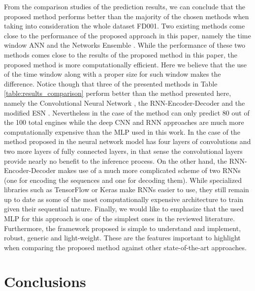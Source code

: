 \documentclass[preprint,12pt]{elsarticle}%
\begin{document}
From the comparison studies of the prediction results, we can conclude that
the proposed method performs better than the majority of the chosen methods
when taking into consideration the whole dataset FD001. Two existing methods
come close to the performance of the proposed approach in this paper, namely
the time window ANN \cite{Lim2016} and the Networks Ensemble \cite{Zhang2016}.
While the performance of these two methods comes close to the results of the
proposed method in this paper, the proposed method is more computationally
efficient. Here we believe that the use of the time window along with a proper size for such window makes the difference. Notice though that three of the presented methods in Table \ref{table:results_comparison} perform better than the method presented here, namely the Convolutional Neural Network \cite{Li2018}, the RNN-Encoder-Decoder \cite{Malhorta2016} and the modified ESN \cite{Peng2012}. Nevertheless in the case of \cite{Peng2012} the method can only predict 80 out of the 100 total engines while the deep CNN \cite{Li2018} and RNN \cite{Malhorta2016} approaches are much more computationally expensive than the MLP used in this work. In the case of the method proposed in \cite{Li2018} the neural network model has four layers of convolutions and two more layers of fully connected layers, in that sense the convolutional layers provide nearly no benefit to the inference process. On the other hand, the RNN-Encoder-Decoder \cite{Malhorta2016} makes use of a much more complicated scheme of two RNNs (one for encoding the sequences and one for decoding them). While specialized libraries such as TensorFlow or Keras make RNNs easier to use, they still remain up to date as some of the most computationally expensive architecture to train given their sequential nature. Finally, we would like to emphasize that the used MLP for this approach is one of the simplest ones in the reviewed literature. Furthermore, the framework proposed is simple to understand and implement, robust, generic and light-weight. These are the features 
important to highlight when comparing the proposed method against other
state-of-the-art approaches.

\section{Conclusions}

\label{sec:conclusions}
\end{document}
